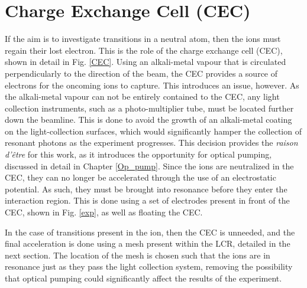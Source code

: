\section{Charge Exchange Cell (CEC)}
If the aim is to investigate transitions in a neutral atom, then the ions must regain their lost electron. This is the role of the charge exchange cell (CEC), shown in detail in Fig. \ref{CEC}. Using an alkali-metal vapour that is circulated perpendicularly to the direction of the beam, the CEC provides a source of electrons for the oncoming ions to capture. This introduces an issue, however. As the alkali-metal vapour can not be entirely contained to the CEC, any light collection instruments, such as a photo-multiplier tube,  must be located further down the beamline. This is done to avoid the growth of an alkali-metal coating on the light-collection surfaces, which would significantly hamper the collection of resonant photons as the experiment progresses. This decision provides the \emph{raison d'être} for this work, as it introduces the opportunity for optical pumping, discussed in detail in Chapter \ref{Op_pump}. Since the ions are neutralized in the CEC, they can no longer be accelerated through the use of an electrostatic potential. As such, they must be brought into resonance before they enter the interaction region. This is done using a set of electrodes present in front of the CEC, shown in Fig. \ref{exp}, as well as floating the CEC.

In the case of transitions present in the ion, then the CEC is unneeded, and the final acceleration is done using a mesh present within the LCR, detailed in the next section. The location of the mesh is chosen such that the ions are in resonance just as they pass the light collection system, removing the possibility that optical pumping could significantly affect the results of the experiment. 



